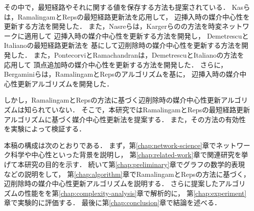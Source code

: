 その中で，最短経路やそれに関する値を保存する方法も提案されている．
Kasらは，RamalingamとRepsの最短経路更新法\cite{Ramalingam1996}を応用して，
辺挿入時の媒介中心性を更新する方法を開発した\cite{Kas2013}．
また，Nasreらは，Kargerらの\cite{Karger1993}の方法を時変ネットワークに適用して
辺挿入時の媒介中心性を更新する方法を開発し\cite{Nasre2014a}，
DemetrescuとItalianoの最短経路更新法\cite{Demetrescu2003}を
基にして辺削除時の媒介中心性を更新する方法を開発した\cite{Nasre2014b}．
また，PontecorviとRamachandranは，DemetrescuとItalianoの方法を応用して
頂点追加時の媒介中心性を更新する方法を開発した\cite{Pontecorvi2015}．
さらに，Bergaminiらは，RamalingamとRepsのアルゴリズムを基に，
辺挿入時の媒介中心性更新アルゴリズムを開発した\cite{Bergamini2017}．

しかし，RamalingamとRepsの方法に基づく辺削除時の媒介中心性更新アルゴリズムは知られていない．
そこで，本研究ではRamalingamとRepsの最短経路更新アルゴリズムに基づく媒介中心性更新法を提案する．
また，その方法の有効性を実験によって検証する．

本稿の構成は次のとおりである．
まず，第\ref{chap:network-science}章でネットワーク科学や中心性といった背景を説明し，
第\ref{chap:related-work}章で関連研究を挙げて本研究の目的を示す．
続いて第\ref{chap:preliminary}章でグラフの数学的表現などの説明をして，
第\ref{chap:algorithm}章でRamalingamとRepsの方法に基づく，
辺削除時の媒介中心性更新アルゴリズムを説明する．
さらに提案したアルゴリズムの性能をを第\ref{chap:complexity-analysis}章で解析的に，
第\ref{chap:experiment}章で実験的に評価する．
最後に第\ref{chap:conclusion}章で結論を述べる．
